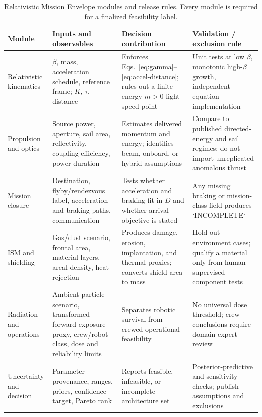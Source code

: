 \documentclass[conference]{../../../../Conference-LaTeX-template_10-17-19/IEEEtran}
\begin{document}
\begin{table}[t]
\caption{Relativistic Mission Envelope modules and release rules. Every module is required for a finalized feasibility label.}
\label{tab:rme-modules}
\centering
\footnotesize
\begin{tabularx}{\textwidth}{@{}p{}Y Y Y@{}}
\toprule
\textbf{Module} & \textbf{Inputs and observables} & \textbf{Decision contribution} & \textbf{Validation / exclusion rule} \\
\midrule
Relativistic kinematics & $\beta$, mass, acceleration schedule, reference frame; $K$, $\tau$, distance & Enforces Eqs.~\eqref{eq:gamma}--\eqref{eq:accel-distance}; rules out a finite-energy $m>0$ light-speed point & Unit tests at low $\beta$, monotonic high-$\beta$ growth, independent equation implementation \\
Propulsion and optics & Source power, aperture, sail area, reflectivity, coupling efficiency, power duration & Estimates delivered momentum and energy; identifies beam, onboard, or hybrid assumptions & Compare to published directed-energy and sail regimes; do not import unreplicated anomalous thrust \\
Mission closure & Destination, flyby/rendezvous label, acceleration and braking paths, communication & Tests whether acceleration and braking fit in $D$ and whether arrival objective is stated & Any missing braking or mission-class field produces `INCOMPLETE` \\
ISM and shielding & Gas/dust scenario, frontal area, material layers, areal density, heat rejection & Produces damage, erosion, implantation, and thermal proxies; converts shield area to mass & Hold out environment cases; qualify a material only from human-supervised component tests \\
Radiation and operations & Ambient particle scenario, transformed forward exposure proxy, crew/robot class, dose and reliability limits & Separates robotic survival from crewed operational feasibility & No universal dose threshold; crew conclusions require domain-expert review \\
Uncertainty and decision & Parameter provenance, ranges, priors, confidence target, Pareto rank & Reports feasible, infeasible, or incomplete architecture set & Posterior-predictive and sensitivity checks; publish assumptions and exclusions \\
\bottomrule
\end{tabularx}
\end{table}
\end{document}
